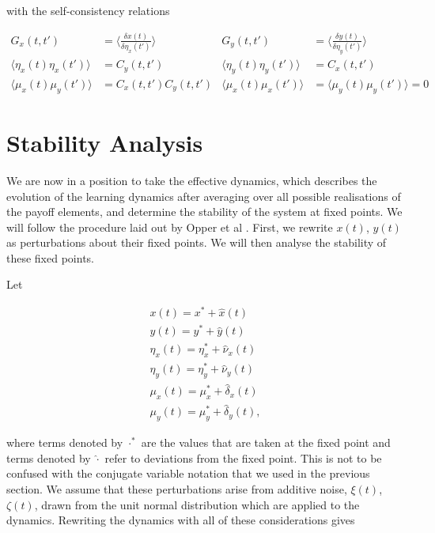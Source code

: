 \documentclass[.../main.tex]{subfiles}
\begin{document}
with the self-consistency relations

\begin{align}
	G_x(t, t') &= \langle \frac{\delta x(t)}{\delta \eta_x(t')}\rangle  & G_y(t, t') &= \langle \frac{\delta y(t)}{\delta
	\eta_y(t')}\rangle  \\
	\langle \eta_x(t) \eta_x(t')\rangle  &= C_y(t, t') & \langle \eta_y(t) \eta_y(t')\rangle  &= C_x(t, t')\\
	\langle \mu_x(t) \mu_y(t')\rangle  &= C_x(t, t') C_y(t, t') & \langle \mu_x(t) \mu_x(t')\rangle  &= \langle \mu_y(t) \mu_y(t')\rangle  = 0
\end{align}

\section{Stability Analysis} %
\label{sec:stability_analysis}

We are now in a position to take the effective dynamics, which describes the evolution of the
learning dynamics after averaging over all possible realisations of the payoff elements, and
determine the stability of the system at fixed points. We will follow the procedure laid out by
Opper et al \cite{Opper}. First, we rewrite $x(t)$, $y(t)$ as perturbations about their fixed
points. We will then analyse the stability of these fixed points.

Let

\begin{align}
	x(t) = x^* + \hat{x}(t) \\
	y(t) = y^* + \hat{y}(t) \\
	\eta_x(t) = \eta_x^* + \hat{\nu}_x(t)\\
	\eta_y(t) = \eta_y^* + \hat{\nu}_y(t)\\
	\mu_x(t) = \mu_x^* + \hat{\delta}_x(t)\\
	\mu_y(t) = \mu_y^* + \hat{\delta}_y(t),
\end{align}

where terms denoted by $\cdot^*$ are the values that are taken at the fixed point and terms denoted
by $\hat{\cdot}$ refer to deviations from the fixed point. This is not to be confused with
the conjugate variable notation that we used in the previous section. We assume that these
perturbations arise from additive noise, $\xi(t)$, $\zeta(t)$, drawn from the unit normal
distribution which are applied to the dynamics. Rewriting the dynamics with all of these
considerations gives
\end{document}
